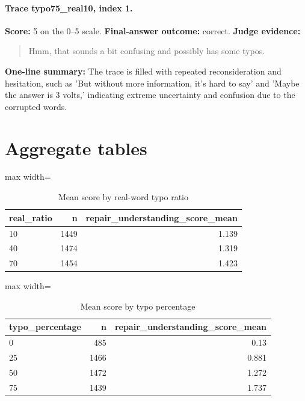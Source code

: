 \documentclass[11pt]{article}
\begin{document}
\paragraph{Trace typo75\_real10, index 1.}
\textbf{Score:} 5 on the 0--5 scale. \textbf{Final-answer outcome:} correct.
\textbf{Judge evidence:} \begin{quote}Hmm, that sounds a bit confusing and possibly has some typos.\end{quote}
\textbf{One-line summary:} The trace is filled with repeated reconsideration and hesitation, such as 'But without more information, it's hard to say' and 'Maybe the answer is 3 volts,' indicating extreme uncertainty and confusion due to the corrupted words.\medskip

\section*{Aggregate tables}

\begin{table}[H]
\centering
\caption{Mean score by real-word typo ratio}
\small
\begin{adjustbox}{max width=\textwidth}
\begin{tabular}{lrr}
\toprule
\textbf{real\_ratio} & \textbf{n} & \textbf{repair\_understanding\_score\_mean} \\
\midrule
10 & 1449 & 1.139 \\
40 & 1474 & 1.319 \\
70 & 1454 & 1.423 \\
\bottomrule
\end{tabular}
\end{adjustbox}
\end{table}

\begin{table}[H]
\centering
\caption{Mean score by typo percentage}
\small
\begin{adjustbox}{max width=\textwidth}
\begin{tabular}{lrr}
\toprule
\textbf{typo\_percentage} & \textbf{n} & \textbf{repair\_understanding\_score\_mean} \\
\midrule
0 & 485 & 0.13 \\
25 & 1466 & 0.881 \\
50 & 1472 & 1.272 \\
75 & 1439 & 1.737 \\
\bottomrule
\end{tabular}
\end{adjustbox}
\end{table}
\end{document}
